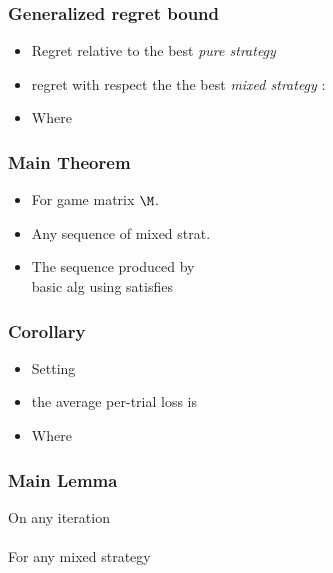 \documentclass[handout]{beamer}
\begin{document}
\begin{frame}
  \frametitle{Generalized regret bound}
  \begin{itemize}
  \item Regret relative to the best {\em pure strategy}
\item    regret with respect the the best {\em mixed strategy}
    \R{$\P$}:
    \item \small{Where }
\end{itemize}
\end{frame}

\begin{frame}
\frametitle{Main Theorem}
\begin{itemize}
\item For  game matrix $\M$.
\item Any sequence of mixed strat. 
\item The sequence  produced by \\
basic alg using  satisfies
\end{itemize}
\end{frame}

\begin{frame}
\frametitle{Corollary}
\begin{itemize}
\item Setting 
\item the average per-trial loss is
\item Where 
\R{\[
\delt = \sqrt{2 \ln n \over T} + {\ln n \over T} 
= O\paren{\sqrt{\frac{\ln n}{T}}}.
\]}
\end{itemize}
\end{frame}

\begin{frame}
\frametitle{Main Lemma}

On any iteration 
\\ ~ \\ \pause
For any mixed strategy \R{$\Pref$}
\\ ~ \\ \pause
{}
\end{frame}
\end{document}
